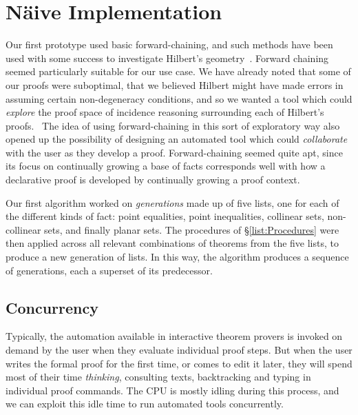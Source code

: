 
\section{N\"{a}ive Implementation}\label{sec:NaiveImplementation}
Our first prototype used basic forward-chaining, and such methods have been used with some success to investigate Hilbert's geometry~\cite{ForwardChainHilbert}. Forward chaining seemed particularly suitable for our use case. We have already noted that some of our proofs were suboptimal, that we believed Hilbert might have made errors in assuming certain non-degeneracy conditions, and so we wanted a tool which could \emph{explore} the proof space of incidence reasoning surrounding each of Hilbert's proofs. 
\
The idea of using forward-chaining in this sort of exploratory way also opened up the possibility of designing an automated tool which could \emph{collaborate} with the user as they develop a proof. Forward-chaining seemed quite apt, since its focus on continually growing a base of facts corresponds well with how a declarative proof is developed by continually growing a proof context. 

Our first algorithm worked on \emph{generations} made up of five lists, one for each of the different kinds of fact: point equalities, point inequalities, collinear sets, non-collinear sets, and finally planar sets. The procedures of \S\ref{list:Procedures} were then applied across all relevant combinations of theorems from the five lists, to produce a new generation of lists. In this way, the algorithm produces a sequence of generations, each a superset of its predecessor.

\subsection{Concurrency}\label{sec:NaiveConcurrency}
Typically, the automation available in interactive theorem provers is invoked on demand by the user when they evaluate individual proof steps. But when the user writes the formal proof for the first time, or comes to edit it later, they will spend most of their time \emph{thinking}, consulting texts, backtracking and typing in individual proof commands. The CPU is mostly idling during this process, and we can exploit this idle time to run automated tools concurrently.

